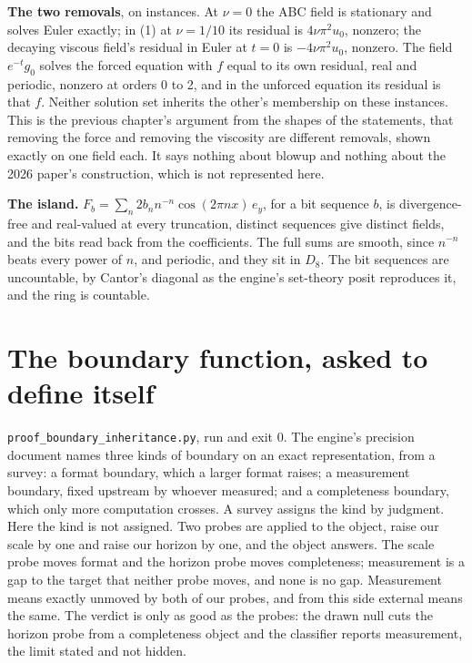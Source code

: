 \textbf{The two removals}, on instances. At $\nu = 0$ the ABC field is stationary and solves Euler
exactly; in (1) at $\nu = 1/10$ its residual is $4\nu\pi^2u_0$, nonzero; the decaying viscous field's
residual in Euler at $t = 0$ is $-4\nu\pi^2u_0$, nonzero. The field $e^{-t}g_0$ solves the forced
equation with $f$ equal to its own residual, real and periodic, nonzero at orders 0 to 2, and in the
unforced equation its residual is that $f$. Neither solution set inherits the other's membership on
these instances. This is the previous chapter's argument from the shapes of the statements, that
removing the force and removing the viscosity are different removals, shown exactly on one field
each. It says nothing about blowup and nothing about the 2026 paper's construction, which is not
represented here.

\textbf{The island.} $F_b = \sum_n 2b_n n^{-n}\cos(2\pi n x)\,e_y$, for a bit sequence $b$, is
divergence-free and real-valued at every truncation, distinct sequences give distinct fields, and the
bits read back from the coefficients. The full sums are smooth, since $n^{-n}$ beats every power of
$n$, and periodic, and they sit in $D_8$. The bit sequences are uncountable, by Cantor's diagonal as
the engine's set-theory posit reproduces it, and the ring is countable.

\section{The boundary function, asked to define itself}

\texttt{proof\_boundary\_inheritance.py}, run and exit 0. The engine's precision document names
three kinds of boundary on an exact representation, from a survey: a format boundary, which a larger
format raises; a measurement boundary, fixed upstream by whoever measured; and a completeness
boundary, which only more computation crosses. A survey assigns the kind by judgment. Here the kind is
not assigned. Two probes are applied to the object, raise our scale by one and raise our horizon by
one, and the object answers. The scale probe moves format and the horizon probe moves
completeness; measurement is a gap to the target that neither probe moves, and none is no gap. Measurement means
exactly unmoved by both of our probes, and from this side external means the same. The verdict is
only as good as the probes: the drawn null cuts the horizon probe from a completeness object and the
classifier reports measurement, the limit stated and not hidden.


